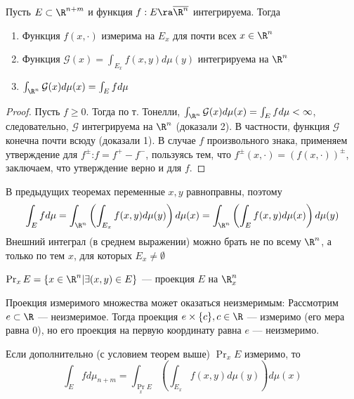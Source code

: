 \begin{theorem}[Фубини]
    Пусть \(E \subset \R^{n + m}\) и функция \(f: E \ra \overline{\R^n}\) интегрируема. Тогда
    \begin{enumerate}
        \item Функция \(f(x, \cdot)\) измерима на \(E_x\) для почти всех \(x \in \R^n\)
        \item Функция \(\mathcal{G}(x) = \int_{E_x}f(x, y)d\mu(y)\) интегрируема на \(\R^n\)
        \item \(\int_{\R^n}\mathcal{G}(x)d\mu(x) = \int_E f d \mu\)
    \end{enumerate}
\end{theorem}
\begin{proof}
    Пусть \(f \ge 0\). Тогда по т. Тонелли, \(\int_{\R^n} \mathcal{G}(x)d\mu(x) = \int_E f d \mu < \infty\), следовательно, \(\mathcal{G}\) интегрируема на \(\R^n\) (доказали 2). В частности, функция \(\mathcal{G}\) конечна почти всюду (доказали 1). В случае \(f\) произвольного знака, применяем утверждение для \(f^\pm\):\(f = f^+ - f^-\), пользуясь тем, что \(f^\pm(x, \cdot) = (f(x, \cdot))^\pm\), заключаем, что утверждение верно и для \(f\).
\end{proof}

\begin{note}
    В предыдущих теоремах переменные \(x, y\) равноправны, поэтому 
    \[\int_E f d \mu = \int_{\R^n}\left(\int_{E_x}f(x, y)d\mu(y)\right)d\mu(x) = \int_{\R^n}\left(\int_E f(x, y)d\mu(x)\right)d\mu(y)\]
    Внешний интеграл (в среднем выражении) можно брать не по всему \(\R^n\), а только по тем \(x\), для которых \(E_x \ne \emptyset\)
\end{note}

\begin{definition}
    \(\Pr_xE = \{x \in \R^n | \exists (x, y) \in E\}\) --- проекция \(E\) на \(\R^n_x\)
\end{definition}

\begin{example}
    Проекция измеримого множества может оказаться неизмеримым:
    Рассмотрим \(e \subset \R\) --- неизмеримое. Тогда проекция \(e \times \{c\}, c \in \R\) --- измеримо (его мера равна 0), но его проекция на первую координату равна \(e\) --- неизмеримо.
\end{example}

\begin{corollary}
    Если дополнительно (с условием теорем выше) \(\Pr_x E\) измеримо, то 
    \[\int_E f d \mu_{n + m} = \int_{\Pr_x E} \left(\int_{E_x} f(x, y)d\mu(y)\right)d\mu(x)\]
\end{corollary}

